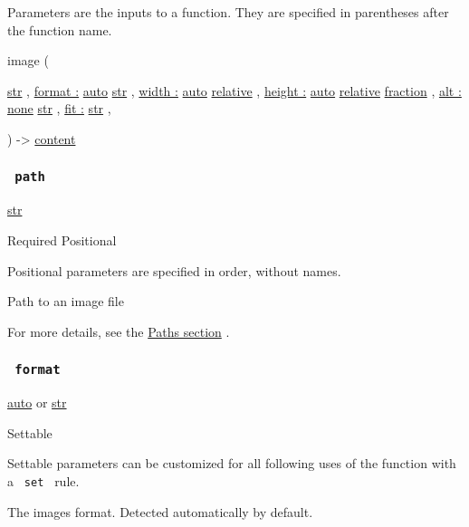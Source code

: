 \label{parameters-tooltip}
Parameters are the inputs to a function. They are specified in
parentheses after the function name.

{ image } (

{ \href{/docs/reference/foundations/str/}{str} , } {
\hyperref[parameters-format]{format :}
\href{/docs/reference/foundations/auto/}{auto}
\href{/docs/reference/foundations/str/}{str} , } {
\hyperref[parameters-width]{width :}
\href{/docs/reference/foundations/auto/}{auto}
\href{/docs/reference/layout/relative/}{relative} , } {
\hyperref[parameters-height]{height :}
\href{/docs/reference/foundations/auto/}{auto}
\href{/docs/reference/layout/relative/}{relative}
\href{/docs/reference/layout/fraction/}{fraction} , } {
\hyperref[parameters-alt]{alt :}
\href{/docs/reference/foundations/none/}{none}
\href{/docs/reference/foundations/str/}{str} , } {
\hyperref[parameters-fit]{fit :}
\href{/docs/reference/foundations/str/}{str} , }

) -\textgreater{} \href{/docs/reference/foundations/content/}{content}

\subsubsection{\texorpdfstring{\texttt{\ path\ }}{ path }}\label{parameters-path}

\href{/docs/reference/foundations/str/}{str}

{Required} {{ Positional }}

\label{parameters-path-positional-tooltip}
Positional parameters are specified in order, without names.

Path to an image file

For more details, see the \href{/docs/reference/syntax/\#paths}{Paths
section} .

\subsubsection{\texorpdfstring{\texttt{\ format\ }}{ format }}\label{parameters-format}

\href{/docs/reference/foundations/auto/}{auto} {or}
\href{/docs/reference/foundations/str/}{str}

{{ Settable }}

\label{parameters-format-settable-tooltip}
Settable parameters can be customized for all following uses of the
function with a \texttt{\ set\ } rule.

The image\textquotesingle s format. Detected automatically by default.

